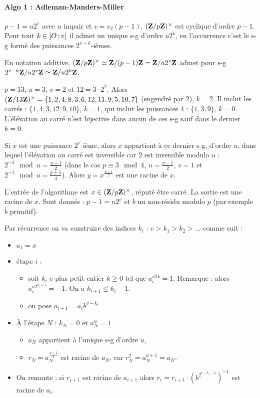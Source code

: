 \paragraph{Algo 1 : Adleman-Manders-Miller}

	$p - 1 = u 2^v$ avec $u$ impair et $v = v_2(p -1)$.
	$(\mathbf{Z} / p\mathbf{Z})^\times$ est cyclique d'ordre $p - 1$.
	Pour tout $k \in \mathopen{}\mathclose{\left[O\mathclose{}\mathpunct{};v\right]}$ il admet un unique s-g d'ordre $u 2^k$, en l'occurrence c'est le s-g formé des puissances $2^{v - k}$-ièmes.
	
	En notation additive, $(\mathbf{Z} / p\mathbf{Z})^\times \simeq \mathbf{Z} / (p-1)\mathbf{Z} = \mathbf{Z} / u2^v \mathbf{Z}$ admet pour s-g $2^{v - k}\mathbf{Z} / u2^v \mathbf{Z} \simeq \mathbf{Z} / u2^k\mathbf{Z}$.

\begin{ex}
	$p = 13$, $u = 3$, $v = 2$ et $12 = 3 \cdot 2^2$.
	Alors $(\mathbf{Z} / 13\mathbf{Z})^\times = \{ 1, 2, 4, 8, 3, 6, 12, 11, 9, 5, 10, 7 \}$ (engendré par 2), $k = 2$.
	Il inclut les carrés : $\{ 1, 4, 3, 12, 9, 10 \}$, $k = 1$, qui inclut les puissances 4 : $\{ 1, 3, 9 \}$, $k = 0$.
	L'élévation au carré n'est bijective dans aucun de ces s-g sauf dans le dernier $k = 0$.
\end{ex}

Si $x$ est une puissance $2^v$-ième, alors $x$ appartient à ce dernier s-g, d'ordre $u$, dans lequel l'élévation au carré est inversible car $2$ est inversible modulo $u$ : $2^{-1} \mod u = \frac{u + 1}{2}$ (dans le cas $p \equiv 3 \mod 4$, $u = \frac{p - 1}{2}$, $v = 1$ et $2^{-1} \mod u = \frac{p + 1}{4}$).
Alors $y = x^{\frac{u + 1}{2}}$ est une racine de $x$.

L'entrée de l'algorithme est $x \in (\mathbf{Z} / p\mathbf{Z})^\times$, réputé être carré.
La sortie est une racine de $x$.
Sont donnés : $p - 1 = n2^v$ et $b$ un non-résidu modulo $p$ (par exemple $b$ primitif).

Par récurrence on va construire des indices $k_i$ : $v > k_1 > k_2 > \ldots$ comme suit :
\begin{itemize}
	\item[\textbullet] $a_1 = x$
	\item[\textbullet] étape $i$ :
		\begin{itemize}
			\item[\textbullet] soit $k_i$ e plus petit entier $k \geq 0$ tel que $a_i^{u2k} = 1$.
				Remarque : alors $a_i^{u 2^{k_i - 1}} = -1$.
				On a $k_{i + 1} \leq k_i - 1$.
			\item[\textbullet] on pose $a_{i + 1} = a_i b^{v - k_i}$
		\end{itemize}
	\item[\textbullet] À l'étape $N$ : $k_N = 0$ et $a_N^u = 1$
		\begin{itemize}
			\item[\textbullet] $a_N$ appartient à l'unique s-g d'ordre $u$,
			\item[\textbullet] $r_N = a_N^{\frac{u + 1}{2}}$ est racine de $a_N$, car $r_N^2 = a_N^{u + 1} = a_N$.
		\end{itemize}
	\item[\textbullet] On remonte : si $r_{i + 1}$ est racine de $a_{i + 1}$ alors $r_i = r_{i + 1} \cdot (b^{2^{v - k_i - 1}})^{-1}$ est racine de $a_i$.
\end{itemize}



